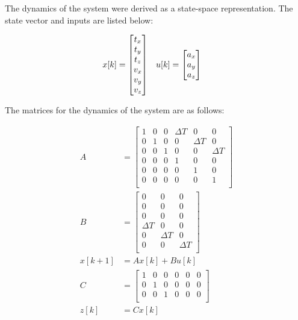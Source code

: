 \documentclass[bare_jrnl_transmag]{subfiles}
\begin{document}
The dynamics of the system were derived as a state-space representation. The state vector and inputs are listed below:

\begin{align*}
    x[k] &= {\null\hbox{$\begin{bmatrix}
    t_x \\
    t_y \\
    t_z \\
    v_x \\
    v_y \\
    v_z
    \end{bmatrix}$}}
    \quad
    u[k] = {\null\hbox{$\begin{bmatrix}
    a_x \\
    a_y \\
    a_z
    \end{bmatrix}$}}
\end{align*}

The matrices for the dynamics of the system are as follows:

\begin{align*}
    A &= 
    \begin{bmatrix}
    1 & 0 & 0 & \Delta T & 0 & 0 \\
    0 & 1 & 0 & 0 & \Delta T & 0 \\
    0 & 0 & 1 & 0 & 0 & \Delta T \\
    0 & 0 & 0 & 1 & 0 & 0 \\
    0 & 0 & 0 & 0 & 1 & 0 \\
    0 & 0 & 0 & 0 & 0 & 1 \\
    \end{bmatrix}
    \\[1em]
    B &= 
    \begin{bmatrix}
    0 & 0 & 0 \\
    0 & 0 & 0 \\
    0 & 0 & 0 \\
    \Delta T & 0 & 0 \\
    0 & \Delta T & 0 \\
    0 & 0 & \Delta T \\
    \end{bmatrix}
    \\[1em]
    x[k+1] &= A x[k] + B u[k]
    \\[1em]
    C &= 
    \begin{bmatrix}
    1 & 0 & 0 & 0 & 0 & 0 \\
    0 & 1 & 0 & 0 & 0 & 0 \\
    0 & 0 & 1 & 0 & 0 & 0 \\
    \end{bmatrix}
    \\[1em]
    z[k] &= C x[k]
\end{align*}
\end{document}
